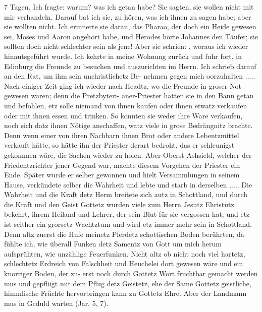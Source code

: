 7 Tagen. Ich fragte: warum? was ich getan habe? Sie sagten,
sie wollen nicht mit mir verhandeln. Darauf bat ich sie, zu hören,
was ich ihnen zu sagen habe; aber sie wollten nicht. Ich 
erinnerte sie daran, das Pharao, der doch ein Heide gewesen sei,
Moses und Aaron angehört habe, und Herodes hörte Johannes
den Täufer; sie sollten doch nicht schlechter sein als jene! Aber
sie schrien: , woraus ich wieder hinautsgeführt
wurde. Ich kehrte in meine Wohnung zurück und fuhr fort, in
Edinburg die Freunde zu besuchen und auszurichten 
im Herrn.
Ich schrieb darauf an den Rat, um ihm sein unchristlichetz Be-
nehmen gegen mich oorzuhalten .....
Nach einiger Zeit ging ich wieder nach Headtz, wo die
Freunde in groser Not gewesen waren; denn die Pretzbyteri-
aner-Priester hatten sie in den Bann getan und befohlen,
etz solle niemand von ihnen kaufen oder ihnen etwatz
verkaufen oder mit ihnen essen und trinken. So konnten sie weder
ihre Ware verkaufen, noch sich datz ihnen Nötige anschaffen, watz
viele in grose Bedrängnitz brachte. Denn wenn einer von ihren
Nachbarn ihnen Brot oder andere Lebentzmittel verkauft hätte, so
hätte ihn der Priester derart bedroht, das er schleunigst gekommen
wäre, die Sachen wieder zu holen. Aber Oberst Ashsield, welcher
der Friedentzrichter jener Gegend war, machte diesem Vorgehen
der Priester ein Ende. Später wurde er selber gewonnen und hielt
Versammlungen in seinem Hause, verkündete selber die Wahrheit
und lebte und starb in derselben .....
Die Wahrheit und die Kraft detz Herm breitete sich autz in
Schottland, und durch die Kraft und den Geist Gottetz wurden
viele zum Herrn Jesutz Ehristutz bekehrt, ihrem Heiland und Lehrer,
der sein Blut für sie vergossen hat; und etz ist seither ein grorsetz
Wachtztum und wird etz immer mehr sein in Schottland. Denn
altz zuerst die Hufe meinetz Pferdetz schottischen Boden berührten,
da fühlte ich, wie überall Funken detz Samentz von Gott um mich
herum aufsprühten, wie unzählige Feuerfunken. Nicht altz ob
nicht noch viel hartetz, schlechtetz Erdreich von Falschheit und
Heuchelei dort gewesen wäre und ein knorriger Boden, der zu-
erst noch durch Gottetz Wort fruchtbar gemacht werden mus
und gepfliigt mit dem Pflug detz Geistetz, ehe der Same Gottetz
geistliche, himmlische Früchte hervorbringen kann zu Gottetz Ehre.
Aber der Landmann mus in Geduld warten (Jar. 5, 7).

